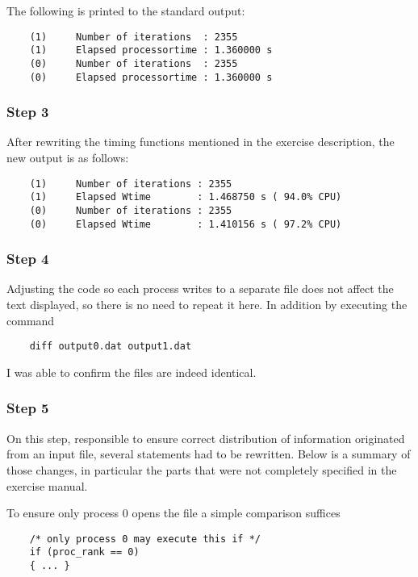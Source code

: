 The following is printed to the standard output:
\begin{lstlisting}
    (1)     Number of iterations  : 2355
    (1)     Elapsed processortime : 1.360000 s
    (0)     Number of iterations  : 2355
    (0)     Elapsed processortime : 1.360000 s
\end{lstlisting}

\subsubsection{Step 3}

After rewriting the timing functions mentioned in the exercise description, the new output is as follows:
\begin{lstlisting}
    (1)     Number of iterations : 2355
    (1)     Elapsed Wtime        : 1.468750 s ( 94.0% CPU)
    (0)     Number of iterations : 2355
    (0)     Elapsed Wtime        : 1.410156 s ( 97.2% CPU)
\end{lstlisting}

\subsubsection{Step 4}

Adjusting the code so each process writes to a separate file does not affect the text displayed, so there is no need to repeat it here. In addition by executing the command

\begin{lstlisting}
    diff output0.dat output1.dat
\end{lstlisting}

I was able to confirm the files are indeed identical.

\subsubsection{Step 5}

On this step, responsible to ensure correct distribution of information originated from an input file, several statements had to be rewritten. Below is a summary of those changes, in particular the parts that were not completely specified in the exercise manual.

To ensure only process 0 opens the file a simple comparison suffices
\begin{lstlisting}
    /* only process 0 may execute this if */
    if (proc_rank == 0)
    { ... }
\end{lstlisting}

